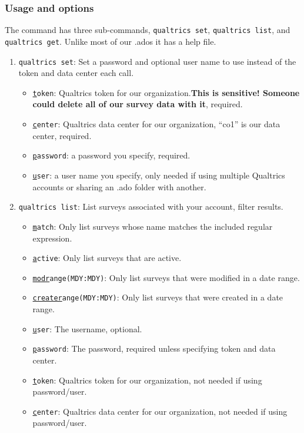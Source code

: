{\subsubsection{Usage and options}
The command has three sub-commands, \texttt{qualtrics set}, \texttt{qualtrics list}, and \texttt{qualtrics get}. Unlike most of our .ados it has a help file.
\begin{enumerate}
\item \texttt{qualtrics set}: Set a password and optional user name to use instead of the token and data center each call.
\begin{itemize}
\item \texttt{\underline{t}oken}: Qualtrics token for our organization.\textbf{This is sensitive! Someone could delete all of our survey data with it}, required.
\item \texttt{\underline{c}enter}: Qualtrics data center for our organization, ``co1'' is our data center, required.
\item \texttt{\underline{p}assword}: a password you specify, required.
\item \texttt{\underline{u}ser}: a user name you specify, only needed if using multiple Qualtrics accounts or sharing an .ado folder with another.
\end{itemize}
\item \texttt{qualtrics list}: List surveys associated with your account, filter results.
\begin{itemize}
\item \texttt{\underline{m}atch}: Only list surveys whose name matches the included regular expression.
\item \texttt{\underline{a}ctive}: Only list surveys that are active.
\item \texttt{\underline{modr}ange(MDY:MDY)}: Only list surveys that were modified in a date range.
\item \texttt{\underline{creater}ange(MDY:MDY)}: Only list surveys that were created in a date range.
\item \texttt{\underline{u}ser}: The username, optional.
\item \texttt{\underline{p}assword}: The password, required unless specifying token and data center.
\item \texttt{\underline{t}oken}: Qualtrics token for our organization, not needed if using password/user.
\item \texttt{\underline{c}enter}: Qualtrics data center for our organization, not needed if using password/user.

\end{itemize}
\end{enumerate}}
